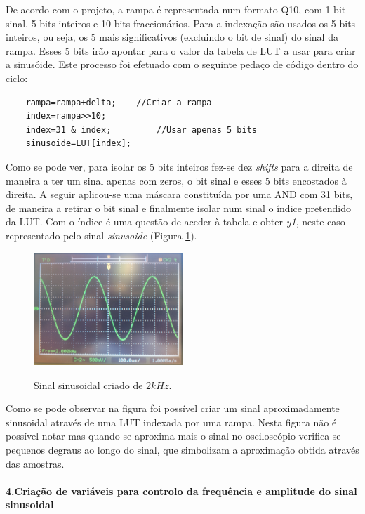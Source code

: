 \documentclass[11pt]{article}
\numberwithin{equation}{section}
\begin{document}
De acordo com o projeto, a rampa é representada num formato Q10, com 1 bit sinal, 5 bits inteiros e 10 bits fraccionários. 
Para a indexação são usados os 5 bits inteiros, ou seja, os 5 mais significativos (excluindo o bit de sinal) do sinal da rampa. Esses 5 bits irão apontar para o valor da tabela de LUT a usar para criar a sinusóide. 
Este processo foi efetuado com o seguinte pedaço de código dentro do ciclo:
\begin{lstlisting}
	rampa=rampa+delta;    //Criar a rampa
	index=rampa>>10;
	index=31 & index;         //Usar apenas 5 bits
	sinusoide=LUT[index];
\end{lstlisting}

Como se pode ver, para isolar os 5 bits inteiros fez-se dez \textit{shifts} para a direita de maneira a ter um sinal apenas com zeros, o bit sinal e esses 5 bits encostados à direita. A seguir aplicou-se uma máscara constituída por uma AND com 31 bits, de maneira a retirar o bit sinal e finalmente isolar num sinal o índice pretendido da LUT. Com o índice é uma questão de aceder à tabela e obter \textit{y1}, neste caso representado pelo sinal \textit{sinusoide} (Figura \ref{fig:sen2k}).
\begin{figure}[H]
	\centering
	\includegraphics[width=0.5\textwidth]{./P1_1seno}~\\
	\caption{Sinal sinusoidal criado de $ 2 kHz $.}
	\label{fig:sen2k}
\end{figure}

Como se pode observar na figura foi possível criar um sinal aproximadamente sinusoidal através de uma LUT indexada por uma rampa. Nesta figura não é possível notar mas quando se aproxima mais o sinal no osciloscópio verifica-se pequenos degraus ao longo do sinal, que simbolizam a aproximação obtida através das amostras.

\paragraph{4.Criação de variáveis para controlo da frequência e amplitude do sinal sinusoidal} \hspace{0pt}
\label{p1-4}
\end{document}
